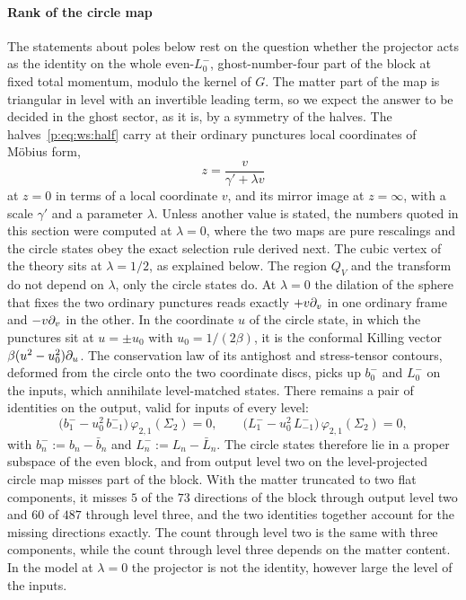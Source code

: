 \paragraph{Rank of the circle map}
\label{p:sec:ws:rank}


The statements about poles below rest on the question whether the projector acts as the identity on the whole even-$L_0^-$, ghost-number-four part of the block at fixed total momentum, modulo the kernel of $G$.
  The matter part of the map is triangular in level with an invertible leading term, so we expect the answer to be decided in the ghost sector, as it is, by a symmetry of the halves.
The halves~\eqref{p:eq:ws:half} carry at their ordinary punctures local coordinates of Möbius form,
\begin{equation}
  \label{p:eq:ws:half-ordinary}
  z
    = \frac{v}{\gamma' + \lambda v}
\end{equation}
at $z = 0$ in terms of a local coordinate $v$, and its mirror image at $z = \infty$, with a scale $\gamma'$ and a parameter $\lambda$.
Unless another value is stated, the numbers quoted in this section were computed at $\lambda = 0$, where the two maps are pure rescalings and the circle states obey the exact selection rule derived next.
The cubic vertex of the theory sits at $\lambda = 1 / 2$, as explained below.
The region $Q_V$ and the transform do not depend on $\lambda$, only the circle states do.
At $\lambda = 0$ the dilation of the sphere that fixes the two ordinary punctures reads exactly $+ v \partial_v$ in one ordinary frame and $- v \partial_v$ in the other.
In the coordinate $u$ of the circle state, in which the punctures sit at $u = \pm u_0$ with $u_0 = 1 / (2 \beta)$, it is the conformal Killing vector $\beta (u^2 - u_0^2) \partial_u$.
The conservation law of its antighost and stress-tensor contours, deformed from the circle onto the two coordinate discs, picks up $b_0^-$ and $L_0^-$ on the inputs, which annihilate level-matched states.
There remains a pair of identities on the output, valid for inputs of every level:
\begin{equation}
  \label{p:eq:ws:selection-rule}
  \big( b_1^- - u_0^2 \, b_{-1}^- \big) \, \varphi_{2,1}(\Sigma_2)
    = 0,
  \qquad
  \big( L_1^- - u_0^2 \, L_{-1}^- \big) \, \varphi_{2,1}(\Sigma_2)
    = 0,
\end{equation}
with $b_n^- := b_n - \bar b_n$ and $L_n^- := L_n - \bar L_n$.
The circle states therefore lie in a proper subspace of the even block, and from output level two on the level-projected circle map misses part of the block.
With the matter truncated to two flat components, it misses $5$ of the $73$ directions of the block through output level two and $60$ of $487$ through level three, and the two identities together account for the missing directions exactly.
The count through level two is the same with three components, while the count through level three depends on the matter content.
In the model at $\lambda = 0$ the projector is not the identity, however large the level of the inputs.

